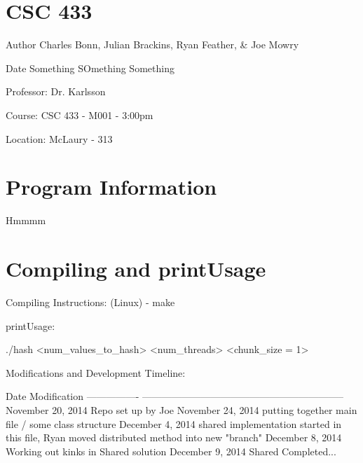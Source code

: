 \hypertarget{index_course_section}{}\section{C\-S\-C 433}\label{index_course_section}
\begin{DoxyAuthor}{Author}
Charles Bonn, Julian Brackins, Ryan Feather, \& Joe Mowry
\end{DoxyAuthor}
\begin{DoxyDate}{Date}
Something S\-Omething Something
\end{DoxyDate}
\begin{DoxyParagraph}{Professor\-:}
Dr. Karlsson
\end{DoxyParagraph}
\begin{DoxyParagraph}{Course\-:}
C\-S\-C 433 -\/ M001 -\/ 3\-:00pm
\end{DoxyParagraph}
\begin{DoxyParagraph}{Location\-:}
Mc\-Laury -\/ 313
\end{DoxyParagraph}
\hypertarget{index_program_section}{}\section{Program Information}\label{index_program_section}
Hmmmm\hypertarget{index_compile_section}{}\section{Compiling and print\-Usage}\label{index_compile_section}
\begin{DoxyParagraph}{Compiling Instructions\-:}
(Linux) -\/ make
\end{DoxyParagraph}
\begin{DoxyParagraph}{print\-Usage\-:}
\begin{DoxyVerb}./hash <num_values_to_hash> <num_threads> <chunk_size = 1>
\end{DoxyVerb}

\end{DoxyParagraph}
\begin{DoxyParagraph}{Modifications and Development Timeline\-:}
\begin{DoxyVerb}Date              Modification
----------------  --------------------------------------------------------------
November 20, 2014 Repo set up by Joe
November 24, 2014 putting together main file / some class structure
December  4, 2014 shared implementation started in this file, Ryan moved
                  distributed method into new "branch"
December  8, 2014 Working out kinks in Shared solution
December  9, 2014 Shared Completed...
\end{DoxyVerb}
 
\end{DoxyParagraph}
